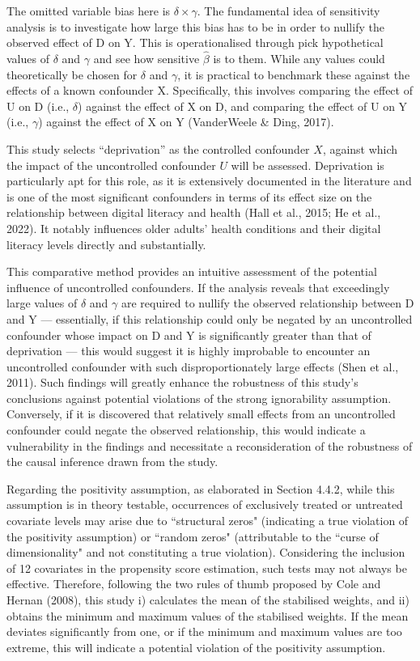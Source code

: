 The omitted variable bias here is $\delta \times \gamma$. The fundamental idea of sensitivity analysis is to investigate how large this bias has to be in order to nullify the observed effect of D on Y. This is operationalised through pick hypothetical values of $\delta$ and $\gamma$ and see how sensitive $\hat{\beta}$ is to them. While any values could theoretically be chosen for $\delta$ and $\gamma$, it is practical to benchmark these against the effects of a known confounder X. Specifically, this involves comparing the effect of U on D (i.e., $\delta$) against the effect of X on D, and comparing the effect of U on Y (i.e., $\gamma$) against the effect of X on Y (VanderWeele \& Ding, 2017). 

This study selects ``deprivation” as the controlled confounder $X$, against which the impact of the uncontrolled confounder $U$ will be assessed. Deprivation is particularly apt for this role, as it is extensively documented in the literature and is one of the most significant confounders in terms of its effect size on the relationship between digital literacy and health (Hall et al., 2015; He et al., 2022). It notably influences older adults' health conditions and their digital literacy levels directly and substantially. 

This comparative method provides an intuitive assessment of the potential influence of uncontrolled confounders. If the analysis reveals that exceedingly large values of $\delta$ and $\gamma$ are required to nullify the observed relationship between D and Y — essentially, if this relationship could only be negated by an uncontrolled confounder whose impact on D and Y is significantly greater than that of deprivation — this would suggest it is highly improbable to encounter an uncontrolled confounder with such disproportionately large effects (Shen et al., 2011). Such findings will greatly enhance the robustness of this study's conclusions against potential violations of the strong ignorability assumption. Conversely, if it is discovered that relatively small effects from an uncontrolled confounder could negate the observed relationship, this would indicate a vulnerability in the findings and necessitate a reconsideration of the robustness of the causal inference drawn from the study.

Regarding the positivity assumption, as elaborated in Section 4.4.2, while this assumption is in theory testable, occurrences of exclusively treated or untreated covariate levels may arise due to ``structural zeros" (indicating a true violation of the positivity assumption) or ``random zeros" (attributable to the ``curse of dimensionality" and not constituting a true violation). Considering the inclusion of 12 covariates in the propensity score estimation, such tests may not always be effective. Therefore, following the two rules of thumb proposed by Cole and Hernan (2008), this study i) calculates the mean of the stabilised weights, and ii) obtains the minimum and maximum values of the stabilised weights. If the mean deviates significantly from one, or if the minimum and maximum values are too extreme, this will indicate a potential violation of the positivity assumption. 

